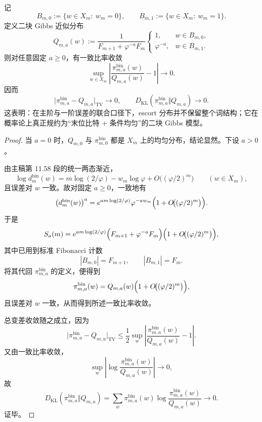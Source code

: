 \begin{theorem}\label{thm:conclusion-binfold-escort-tv-collapse-lastbit-gibbs}
记
\[
B_{m,0}:=\{w\in X_m:\ w_m=0\},
\qquad
B_{m,1}:=\{w\in X_m:\ w_m=1\}.
\]
定义二块 Gibbs 近似分布
\[
Q_{m,a}(w):=
\frac{1}{F_{m+1}+\varphi^{-a}F_m}
\begin{cases}
1, & w\in B_{m,0},\\[1mm]
\varphi^{-a}, & w\in B_{m,1}.
\end{cases}
\]
则对任意固定 \(a\ge0\)，有一致比率收敛
\[
\sup_{w\in X_m}\left|\frac{\pi_{m,a}^{\mathrm{bin}}(w)}{Q_{m,a}(w)}-1\right|\longrightarrow0.
\]
因而
\[
\bigl|\pi_{m,a}^{\mathrm{bin}}-Q_{m,a}\bigr|_{\mathrm{TV}}\to0,
\qquad
D_{\mathrm{KL}}(\pi_{m,a}^{\mathrm{bin}}\Vert Q_{m,a})\to0.
\]
这表明：在主阶与一阶误差的联合口径下，escort 分布并不保留整个词结构；它在概率论上真正规约为“末位比特 + 条件均匀”的二块 Gibbs 模型。
\end{theorem}
\begin{proof}
当 \(a=0\) 时，\(Q_{m,0}\) 与 \(\pi_{m,0}^{\mathrm{bin}}\) 都是 \(X_m\) 上的均匀分布，结论显然。下设 \(a>0\)。

由主稿第 \(11.58\) 段的统一两态渐近，
\[
\log d_m^{\mathrm{bin}}(w)
=
m\log(2/\varphi)-w_m\log\varphi+O\!\bigl((\varphi/2)^m\bigr)
\qquad (w\in X_m),
\]
且误差对 \(w\) 一致。故对固定 \(a\ge0\)，一致地有
\[
\bigl(d_m^{\mathrm{bin}}(w)\bigr)^a
=
e^{am\log(2/\varphi)}\varphi^{-aw_m}
\Bigl(1+O\!\bigl((\varphi/2)^m\bigr)\Bigr).
\]
于是
\[
S_a(m)
=
e^{am\log(2/\varphi)}
\Bigl(F_{m+1}+\varphi^{-a}F_m\Bigr)
\Bigl(1+O\!\bigl((\varphi/2)^m\bigr)\Bigr),
\]
其中已用到标准 Fibonacci 计数
\[
|B_{m,0}|=F_{m+1},
\qquad
|B_{m,1}|=F_m.
\]
将其代回 \(\pi_{m,a}^{\mathrm{bin}}\) 的定义，便得到
\[
\pi_{m,a}^{\mathrm{bin}}(w)
=
Q_{m,a}(w)\Bigl(1+O\!\bigl((\varphi/2)^m\bigr)\Bigr),
\]
且误差对 \(w\) 一致，从而得到所述一致比率收敛。

总变差收敛随之成立，因为
\[
\bigl|\pi_{m,a}^{\mathrm{bin}}-Q_{m,a}\bigr|_{\mathrm{TV}}
\le
\frac12\sup_w\left|\frac{\pi_{m,a}^{\mathrm{bin}}(w)}{Q_{m,a}(w)}-1\right|.
\]
又由一致比率收敛，
\[
\sup_w\left|\log\frac{\pi_{m,a}^{\mathrm{bin}}(w)}{Q_{m,a}(w)}\right|\to0,
\]
故
\[
D_{\mathrm{KL}}(\pi_{m,a}^{\mathrm{bin}}\Vert Q_{m,a})
=
\sum_w \pi_{m,a}^{\mathrm{bin}}(w)\log\frac{\pi_{m,a}^{\mathrm{bin}}(w)}{Q_{m,a}(w)}
\longrightarrow 0.
\]
证毕。
\end{proof}

